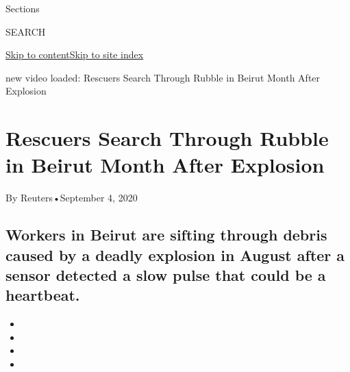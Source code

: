 Sections

SEARCH

\protect\hyperlink{site-content}{Skip to
content}\protect\hyperlink{site-index}{Skip to site index}

new video loaded: Rescuers Search Through Rubble in Beirut Month After
Explosion

\hypertarget{rescuers-search-through-rubble-in-beirut-month-after-explosion}{%
\section{Rescuers Search Through Rubble in Beirut Month After
Explosion}\label{rescuers-search-through-rubble-in-beirut-month-after-explosion}}

By Reuters•September 4, 2020

\hypertarget{workers-in-beirut-are-sifting-through-debris-caused-by-a-deadly-explosion-in-august-after-a-sensor-detected-a-slow-pulse-that-could-be-a-heartbeat}{%
\subsection{Workers in Beirut are sifting through debris caused by a
deadly explosion in August after a sensor detected a slow pulse that
could be a
heartbeat.}\label{workers-in-beirut-are-sifting-through-debris-caused-by-a-deadly-explosion-in-august-after-a-sensor-detected-a-slow-pulse-that-could-be-a-heartbeat}}

\begin{itemize}
\item
\item
\item
\item
\end{itemize}

